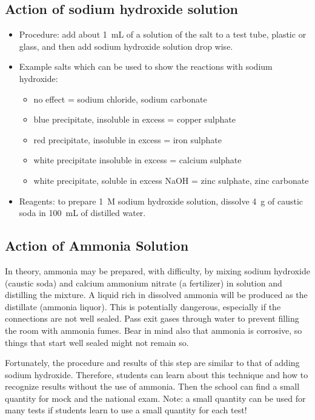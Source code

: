 \subsection{Action of sodium hydroxide solution}
\begin{itemize}
\item{Procedure: add about 1~mL of a solution of the salt to a test tube, 
plastic or glass, 
and then add sodium hydroxide solution drop wise.}
\item{Example salts which can be used to show the reactions with sodium hydroxide:}
\begin{itemize}
\item{no effect = sodium chloride, 
sodium carbonate}
\item{blue precipitate, 
insoluble in excess = copper sulphate}
\item{red precipitate, 
insoluble in excess = iron sulphate}
\item{white precipitate insoluble in excess = calcium sulphate}
\item{white precipitate, 
soluble in excess NaOH = zinc sulphate, 
zinc carbonate}
\end{itemize}
\item{Reagents: to prepare 1~M sodium hydroxide solution, 
dissolve 4~g of caustic soda in 100~mL of distilled water.}
\end{itemize}

\subsection{Action of Ammonia Solution}
In theory, 
ammonia may be prepared, 
with difficulty, 
by mixing sodium hydroxide (caustic soda) 
and calcium ammonium nitrate (a fertilizer) in solution 
and distilling the mixture. 
A liquid rich in dissolved ammonia will be produced 
as the distillate (ammonia liquor). 
This is potentially dangerous, 
especially if the connections are not well sealed. 
Pass exit gases through water to prevent filling the room 
with ammonia fumes. 
Bear in mind also that ammonia is corrosive, 
so things that start well sealed might not remain so. 

Fortunately, 
the procedure and results of this step are similar 
to that of adding sodium hydroxide. 
Therefore, 
students can learn about this technique 
and how to recognize results without the use of ammonia. 
Then the school can find a small quantity for mock and the national exam.
Note: a small quantity can be used for many tests 
if students learn to use a small quantity for each test!

